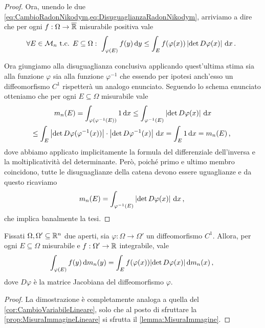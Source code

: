 \begin{proof}
	Ora, unendo le due \cref{eq:CambioRadonNikodym,eq:DisuguaglianzaRadonNikodym}, arriviamo a dire che per ogni $f:\Omega\to\overline{\mathbb R}$ misurabile positiva vale
	\begin{equation*}
		\forall E\in \mathcal M_n\text{ t.c. } E\subseteq\Omega:\ \int_{\varphi(E)} f(y)\,\mathrm d y\le 
		\int_E f(\varphi(x))\left\lvert\det D\varphi(x)\right\rvert\,\mathrm d x \, \text{. }
	\end{equation*}
	
	Ora giungiamo alla disuguaglianza conclusiva applicando quest'ultima stima sia alla funzione $\varphi$ sia alla funzione $\varphi^{-1}$ che essendo per ipotesi anch'esso un diffeomorfismo $C^1$ rispetterà un analogo enunciato.
	Seguendo lo schema enunciato otteniamo che per ogni $E\subseteq\Omega$ misurabile vale
	\begin{multline*}
		m_n(E) =\int_{\varphi(\varphi^{-1}(E))}1\,\mathrm d x\le \int_{\varphi^{-1}(E)} \left\lvert\det D\varphi(x)\right\rvert\,\mathrm d x \\
 		\le \int_E \left\lvert\det D\varphi(\varphi^{-1}(x))\right\rvert \cdot \left\lvert\det D\varphi^{-1}(x)\right\rvert\,\mathrm d x =\int_E 1\,\mathrm d x=m_n(E) \, \text{, }
	\end{multline*}
	dove abbiamo applicato implicitamente la formula del differenziale dell'inversa e la moltiplicatività del determinante.
	Però, poiché primo e ultimo membro coincidono, tutte le disuguaglianze della catena devono essere uguaglianze e da questo ricaviamo
	\begin{equation*}
		m_n(E)=\int_{\varphi^{-1}(E)} \left\lvert\det D\varphi(x)\right\rvert\,\mathrm d x \, \text{, }
	\end{equation*}
	che implica banalmente la tesi.
\end{proof}

\begin{theorem}\label{thm:CambioVariabile}
	Fissati $\Omega,\Omega'\subseteq\mathbb R^n$ due aperti, sia $\varphi:\Omega\to\Omega'$ un diffeomorfismo $C^1$.
	Allora, per ogni $E\subseteq \Omega$ misurabile e $f:\Omega'\to\mathbb R$ integrabile, vale
	\begin{equation*}
		\int_{\varphi(E)} f(y)\,\mathrm d m_n(y) = \int_{E} f(\varphi(x))\lvert \det D\varphi(x) \rvert \,\mathrm d m_n(x) \, \text{, }
	\end{equation*}
	dove $D\varphi$ è la matrice Jacobiana del diffeomorfismo $\varphi$.
\end{theorem}
\begin{proof}
	La dimostrazione è completamente analoga a quella del \cref{cor:CambioVariabileLineare}, solo che al posto di sfruttare la \cref{prop:MisuraImmagineLineare} si sfrutta il \cref{lemma:MisuraImmagine}.
\end{proof}

